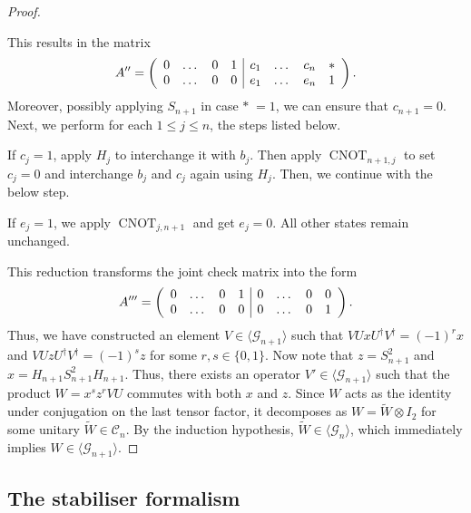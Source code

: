 \documentclass[a4paper, oneside, 12pt]{amsart}
\DeclareMathOperator{\CNOT}{CNOT}
\begin{document}
\begin{proof}
\begin{thmlist}
  \end{thmlist}
  This results in the matrix
  \begin{equation*}
    A''=\left(
      \begin{array}{c c c c| c c c c}
        0 & \dots & 0 & 1 & c_{1} & \dots & c_{n} & * \\
        0 & \dots & 0 & 0 & e_{1} & \dots & e_{n} & 1
      \end{array}
    \right).
  \end{equation*}
  Moreover, possibly applying \(S_{n+1}\) in case \(*\;=1\), we can ensure that \(c_{n+1}=0\).
  Next, we perform for each \(1 \leq j \leq n\), the  steps listed below.
  \begin{thmlist}
    \item If \(c_{j}=1\), apply \(H_{j}\) to interchange it with \(b_{j}\).
    Then apply \(\CNOT_{n+1,j}\) to set \(c_{j}=0\) and interchange \(b_{j}\) and \(c_{j}\) again using \(H_{j}\).
    Then, we continue with the below step.
    \item If \(e_{j}=1\), we apply \(\CNOT_{j, n+1}\) and get \(e_{j}=0\). All other states remain unchanged.
  \end{thmlist}
  This reduction transforms the joint check matrix into the form
  \begin{equation*}
    A'''=\left(
      \begin{array}{c c c c| c c c c}
        0 & \dots & 0 & 1 & 0 & \dots & 0 & 0 \\
        0 & \dots & 0 & 0 & 0 & \dots & 0 & 1
      \end{array}
    \right).
  \end{equation*}
  Thus, we have constructed an element \(V \in \langle\mathcal{G}_{n+1}\rangle \) such that \(V U x U^\dagger V^\dagger = (-1)^r x\) and \(V U z U^\dagger V^\dagger = (-1)^s z\) for some  \(r, s \in \{0, 1\}\).
  Now note that \(z = S_{n+1}^{2}\) and \(x = H_{n+1}S_{n+1}^{2} H_{n+1}\).
  Thus, there exists an operator \(V' \in \langle \mathcal{G}_{n+1}\rangle\) such that the product \(W = x^{s}z^{r}VU\) commutes with both \(x\) and \(z\).
  Since \(W\) acts as the identity under conjugation on the last tensor factor, it decomposes as \(W = \tilde{W} \otimes I_2\) for some unitary \(\tilde{W} \in \mathcal{C}_n\).
  By the induction hypothesis, \(\tilde{W} \in \langle\mathcal{G}_n\rangle\), which immediately implies \(W \in \langle\mathcal{G}_{n+1}\rangle\).
\end{proof}

\subsection{The stabiliser formalism}\label{sec:the-stabiliser-formalism}
\end{document}
